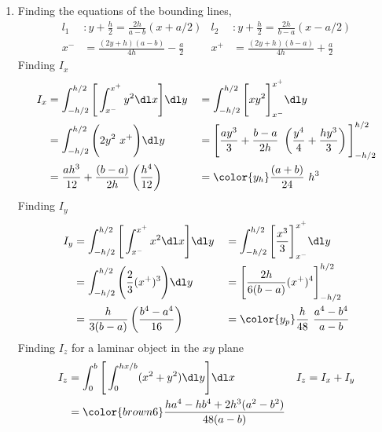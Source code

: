 \begin{enumerate}
    \item Finding the equations of the bounding lines,
          \begin{align}
              l_1 & : y + \frac{h}{2} = \frac{2h}{a - b}(x + a/2) &
              l_2 & : y + \frac{h}{2} = \frac{2h}{b-a}(x - a/2)     \\
              x^- & = \frac{(2y + h)(a-b)}{4h} - \frac{a}{2}      &
              x^+ & = \frac{(2y + h)(b-a)}{4h} + \frac{a}{2}
          \end{align}
          Finding $ I_x $
          \begin{align}
              I_x     & = \int_{-h/2}^{h/2} \Bigg[\int_{x^-}^{x^+} y^2 \dl x \Bigg]
              \dl y   &
                      & = \int_{-h/2}^{h/2} \Bigg[ xy^2\Bigg]_{x^-}^{x^+}
              \dl y                                                                   \\
                      & = \int_{-h/2}^{h/2} \Bigg(2y^2\ x^+\Bigg) \dl y             &
                      & = \Bigg[ \frac{ay^3}{3} + \frac{b-a}{2h}\ \left( \frac{y^4}
              {4} + \frac{hy^3}{3} \right) \Bigg]_{-h/2}^{h/2}                        \\
                      & = \frac{ah^3}{12} + \frac{(b-a)}{2h} \left( \frac{h^4}{12}
              \right) &
                      & = \color{y_h} \frac{(a + b)}{24}\ h^3
          \end{align}
          Finding $ I_y $
          \begin{align}
              I_y   & = \int_{-h/2}^{h/2} \Bigg[\int_{x^-}^{x^+} x^2 \dl x \Bigg]
              \dl y &
                    & = \int_{-h/2}^{h/2} \Bigg[ \frac{x^3}{3} \Bigg]_{x^-}^{x^+}
              \dl y                                                                 \\
                    & = \int_{-h/2}^{h/2} \Bigg(\frac{2}{3} (x^+)^3\Bigg) \dl y   &
                    & = \Bigg[ \frac{2h}{6(b-a)} (x^+)^4 \Bigg]_{-h/2}^{h/2}        \\
                    & = \frac{h}{3(b-a)} \left( \frac{b^4 - a^4}{16} \right)      &
                    & = \color{y_p} \frac{h}{48}\ \frac{a^4 - b^4}{a - b}
          \end{align}
          Finding $ I_z $ for a laminar object in the $ xy $ plane
          \begin{align}
              I_z   & = \int_{0}^{b} \Bigg[\int_{0}^{hx/b} (x^2 + y^2) \dl y\Bigg]
              \dl x &
              I_z   & = I_x + I_y                                                      \\
                    & = \color{brown6} \frac{ha^4 - hb^4 + 2h^3(a^2 - b^2)}{48(a - b)}
          \end{align}


\end{enumerate}
